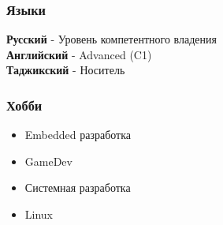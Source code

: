 \documentclass[a4paper,10pt]{article}
\begin{document}
\subsubsection*{Языки}
\textbf{Русский} - Уровень компетентного владения \\
\textbf{Английский} - Advanced (C1) \\
\textbf{Таджикский} - Носитель
\subsubsection*{Хобби}
\begin{itemize}
    \item Embedded разработка
    \item GameDev
    \item Системная разработка
    \item Linux
\end{itemize}
\end{document}
